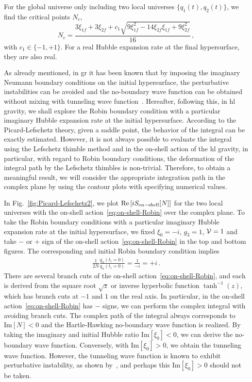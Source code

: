 \documentclass[superscriptaddress,aps,preprintnumbers,nofootinbib]{revtex4-2}
\begin{document}
For the global universe only including two local universes $\{q_{1}(t),q_{2}(t)\}$, we find the critical points $N_c$, 
\begin{equation}
N_c=\frac{3 \xi_{1f}+3 \xi_{2f}+c_{1}\sqrt{9 \xi_{1f}^2-14 \xi_{2f} \xi_{1f}
+9 \xi_{2f}^2}}{16} \,,
\end{equation}
with $c_{1} \in \{-1 , +1\}$. For a real Hubble expansion rate at the final hypersurface, they are also real. 


As already mentioned, in \ac{gr} it has been known that by imposing the imaginary Neumann boundary conditions on the initial hypersurface, the perturbative instabilities can be avoided and the no-boundary wave function can be obtained without mixing with tunneling wave function~\cite{DiTucci:2019dji,DiTucci:2019bui}. Hereafter, following this, in \ac{hl} gravity, we shall explore the Robin boundary condition with a particular imaginary Hubble expansion rate at the initial hypersurface. According to the Picard-Lefschetz theory, given a saddle point, the behavior of the integral can be exactly estimated. However, it is not always possible to evaluate the integral using the Lefschetz thimble method and in the on-shell action of the \ac{hl} gravity, in particular, with regard to Robin boundary conditions, the deformation of the integral path by the Lefschetz thimbles is non-trivial. Therefore, to obtain a meaningful result, we will consider the appropriate integration path in the complex plane by using the contour plots with specifying numerical values. 


In Fig.~\ref{fig:Picard-Lefschetz2}, we plot $\textrm{Re}\left[iS_{\rm on-shell}[N]\right]$ for the two local universes with the on-shell action~\eqref{eq:on-shell-Robin} over the complex plane. To take the Robin boundary conditions with a particular imaginary Hubble expansion rate at the initial hypersurface, we fixed $\xi_0=-i$, $g_3=1$, ${\cal V}=1$ and take $-$ or $+$ sign of the on-shell action~\eqref{eq:on-shell-Robin} in the top and bottom figures. The corresponding and initial Robin boundary condition implies 
\begin{align}
    \frac{1}{2N}
\frac{\dot{q}_{\alpha}(t_{i}=0)}{q_{\alpha}(t_{i}=0)}
=\frac{1}{-i}=+i\,.
\end{align}
There are several branch cuts of the on-shell action~\eqref{eq:on-shell-Robin}, and each is derived from the square root $\sqrt{z}$ or inverse hyperbolic function $\tanh ^{-1}(z)$, which has branch cuts at $-1$ and $1$ on the real axis. In particular, in the on-shell action~\eqref{eq:on-shell-Robin} has $-$ signs, we can perform the complex integral with avoiding branch cuts. The complex path of the integral always corresponds to $\textrm{Im}[N] < 0$ and the Hartle-Hawking no-boundary wave function is realized. By taking the imaginary and initial Hubble ratio $\textrm{Im}[\xi_0] < 0$, we can derive the no-boundary wave function. Conversely, with $\textrm{Im}[\xi_0] > 0$, we obtain the tunneling wave function. However, the tunneling wave function is known to exhibit perturbative instability, as shown by~\cite{Feldbrugge:2017fcc,Feldbrugge:2017mbc}, and perhaps this $\textrm{Im}[\xi_0] > 0$ should not be taken.
\end{document}

